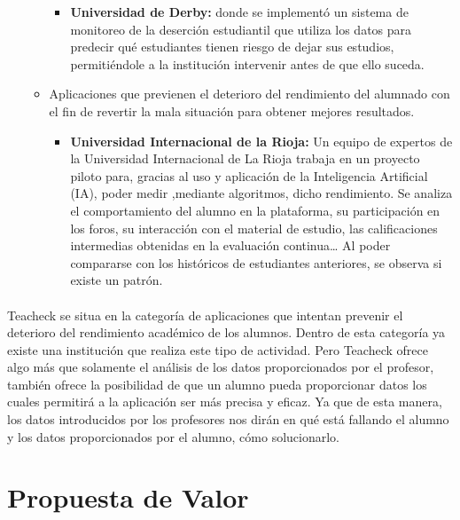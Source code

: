\begin{itemize}
\begin{itemize}
\begin{itemize}
\item \textbf{Universidad de Derby:} donde se implementó un sistema de
  monitoreo de la deserción estudiantil que utiliza los datos para
  predecir qué estudiantes tienen riesgo de dejar sus estudios,
  permitiéndole a la institución intervenir antes de que ello
  suceda.\cite{riesgoDejarEstudios}
\end{itemize}
\item Aplicaciones que previenen el deterioro del rendimiento del
  alumnado con el fin de revertir la mala situación para obtener
  mejores resultados.
\begin{itemize}
\item \textbf{Universidad Internacional de la Rioja:} Un equipo de
  expertos de la Universidad Internacional de La Rioja trabaja en un
  proyecto piloto para, gracias al uso y aplicación de la Inteligencia
  Artificial (IA), poder medir ,mediante algoritmos, dicho
  rendimiento. Se analiza el comportamiento del alumno en la
  plataforma, su participación en los foros, su interacción con el
  material de estudio, las calificaciones intermedias obtenidas en la
  evaluación continua… Al poder compararse con los históricos de
  estudiantes anteriores, se observa si existe un
  patrón.\cite{rendimientoAlumnos}
\end{itemize}
\end{itemize}
\end{itemize}

\paragraph{} Teacheck se situa en la categoría de aplicaciones que intentan prevenir el deterioro del rendimiento académico de los alumnos. Dentro de esta categoría ya existe una institución que realiza este tipo de actividad. Pero Teacheck ofrece algo más que solamente el análisis de los datos proporcionados por el profesor, también ofrece la posibilidad de que un alumno pueda proporcionar datos los cuales permitirá a la aplicación ser más precisa y eficaz.
Ya que de esta manera, los datos introducidos por los profesores nos
dirán en qué está fallando el alumno y los datos proporcionados por el
alumno, cómo solucionarlo.


\section{Propuesta de Valor}

